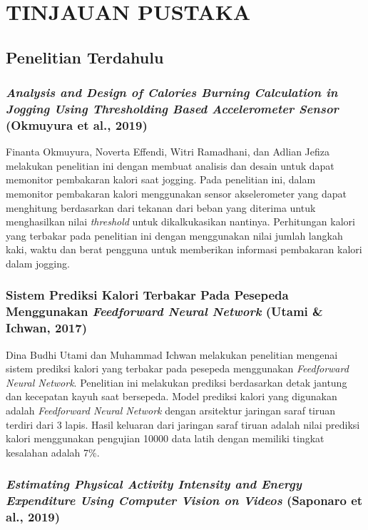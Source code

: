 \chapter{TINJAUAN PUSTAKA}
\label{chap:tinjauanpustaka}

\section{Penelitian Terdahulu}
\label{sec:penelitianterdahulu}

\subsection{\emph{Analysis and Design of Calories Burning Calculation in Jogging Using Thresholding Based Accelerometer Sensor }(Okmuyura et al., 2019)}
\label{subsec:penelitian1}

Finanta Okmuyura, Noverta Effendi, Witri Ramadhani, dan Adlian Jefiza melakukan penelitian ini dengan membuat analisis dan desain untuk dapat memonitor pembakaran kalori saat jogging. Pada penelitian ini, dalam memonitor pembakaran kalori menggunakan sensor akselerometer yang dapat menghitung berdasarkan dari tekanan dari beban yang diterima untuk menghasilkan nilai \emph{threshold} untuk dikalkukasikan nantinya. Perhitungan kalori yang terbakar pada penelitian ini dengan menggunakan nilai jumlah langkah kaki, waktu dan berat pengguna untuk memberikan informasi pembakaran kalori dalam jogging.
  
\subsection{Sistem Prediksi Kalori Terbakar Pada Pesepeda Menggunakan \emph{Feedforward Neural Network} (Utami \& Ichwan, 2017)}
\label{subsec:penelitian2}

Dina Budhi Utami dan Muhammad Ichwan melakukan penelitian mengenai sistem prediksi kalori yang terbakar pada pesepeda menggunakan \emph{Feedforward Neural Network}. Penelitian ini melakukan prediksi berdasarkan detak jantung dan kecepatan kayuh saat bersepeda. Model prediksi kalori yang digunakan adalah \emph{Feedforward Neural Network} dengan arsitektur jaringan saraf tiruan terdiri dari 3 lapis. Hasil keluaran dari jaringan saraf tiruan adalah nilai prediksi kalori menggunakan pengujian 10000 data latih dengan memiliki tingkat kesalahan adalah 7\%.

\subsection{\emph{Estimating Physical Activity Intensity and Energy Expenditure Using Computer Vision on Videos} (Saponaro et al.,  2019)}
\label{subsec:penelitian3}

